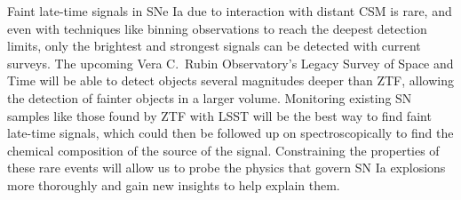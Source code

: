\documentclass[a4paper,oneside,12pt, class=Latex/Classes/PhDthesisPSnPDF, crop=false]{standalone}
\begin{document}
Faint late-time signals in SNe Ia due to interaction with distant CSM is rare, and even with techniques like binning observations to reach the deepest detection limits, only the brightest and strongest signals can be detected with current surveys. The upcoming Vera C.~Rubin Observatory's Legacy Survey of Space and Time \cite[LSST;][]{LSST} will be able to detect objects several magnitudes deeper than ZTF, allowing the detection of fainter objects in a larger volume. Monitoring existing SN samples like those found by ZTF with LSST will be the best way to find faint late-time signals, which could then be followed up on spectroscopically to find the chemical composition of the source of the signal. Constraining the properties of these rare events will allow us to probe the physics that govern SN Ia explosions more thoroughly and gain new insights to help explain them.
\end{document}

